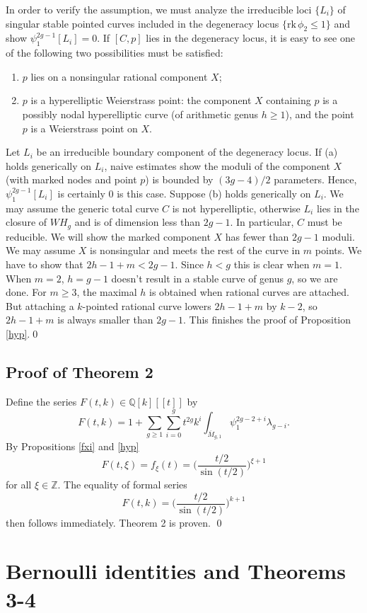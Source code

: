 \documentclass[11 pt]{amsart}
\newcommand{\Q}{\mathbb{Q}}
\newcommand{\Z}{\mathbb{Z}}
\newcommand{\epf}{\qed \vspace{+10pt}}
\newcommand{\rk}{\text{rk}}
\begin{document}
In order to verify the assumption,
we must analyze the 
irreducible loci $\{L_i\}$ of singular stable pointed curves
included in the degeneracy locus 
$\{\rk\,\phi_2\le1\}$ and
show $\psi_1^{2g-1} [L_i]=0$.
If $[C,p]$ lies in the degeneracy locus,
it is easy to see
one of the following two possibilities must be satisfied:
\begin{enumerate}
\item[(a)]  $p$ lies on a nonsingular rational component $X$;
\item[(b)] $p$ is a
hyperelliptic Weierstrass point: the component $X$ containing $p$
is a possibly nodal hyperelliptic curve (of arithmetic
genus $h\geq 1$), and the point $p$
is a Weierstrass point on $X$. 
\end{enumerate}
Let $L_i$ be an irreducible boundary component of the
degeneracy locus. If (a) holds generically on $L_i$,
naive estimates show 
the moduli of the component $X$ (with marked nodes
and point $p$) is bounded by $(3g-4)/2$ parameters. 
Hence, $\psi_1^{2g-1}[L_i]$
is certainly 0 is this case. 
Suppose (b) holds generically
on $L_i$. 
We may assume  the generic total curve $C$
is not hyperelliptic, otherwise $L_i$ lies in the closure of $WH_g$
and is of dimension less than $2g-1$.
In particular, $C$ must be reducible. We will show  the marked
component $X$ has fewer than $2g-1$ moduli.
We may assume $X$ is nonsingular and
meets the rest of the curve in $m$ points. We have to show that
$2h-1+m<2g-1$. Since $h<g$ this is clear when $m=1$. When $m=2$,
$h=g-1$ doesn't result in a stable curve of genus $g$, so we are done.
For $m\ge3$, the maximal $h$ is obtained when rational curves are
attached. But attaching a $k$-pointed rational curve lowers $2h-1+m$
by $k-2$, so $2h-1+m$ is always smaller than $2g-1$.
This finishes the proof of Proposition \ref{hyp}.\epf

\subsection{Proof of Theorem 2}
Define the series $F(t,k)\in \Q[k][[t]]$ by
$$F(t,k)= 1+ \sum_{g\geq 1} \sum_{i=0}^{g} t^{2g} k^i
\int_{\overline{M}_{g,1}} \psi_1^{2g-2+i} \lambda_{g-i}.$$
By Propositions \ref{fxi} and \ref{hyp}
$$F(t,\xi)= f_\xi(t)=\Big( \frac{t/2}{\sin(t/2)} \Big)^{\xi+1}$$
for all $\xi \in \Z$. The equality of formal series
$$F(t,k)= \Big( \frac{t/2}{\sin(t/2)} \Big) ^{k+1}$$
then follows  immediately. Theorem 2 is proven. \qed

\section{\bf{Bernoulli identities and Theorems 3-4}}
\end{document}
